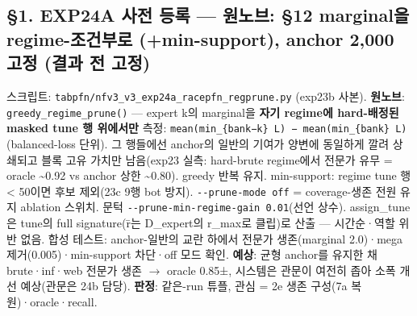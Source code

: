 \subsection{§1. EXP24A 사전 등록 — 원노브: §12 marginal을 regime-조건부로 (+\allowbreak{}min-support), anchor 2,000 고정 (결과 전 고정)}
스크립트: \texttt{tabpfn/\allowbreak{}\allowbreak{}n\allowbreak{}fv3\_\allowbreak{}\allowbreak{}v3\_\allowbreak{}\allowbreak{}e\allowbreak{}xp24a\_\allowbreak{}\allowbreak{}ra\allowbreak{}cepfn\_\allowbreak{}\allowbreak{}re\allowbreak{}gprune.\allowbreak{}p\allowbreak{}y} (exp23b 사본). \textbf{원노브}: \texttt{greedy\_\allowbreak{}\allowbreak{}r\allowbreak{}egime\_\allowbreak{}\allowbreak{}pr\allowbreak{}une()} — expert k의 marginal을 \textbf{자기 regime에 hard-배정된 masked tune 행 위에서만} 측정: \texttt{mean(min\allowbreak{}\_\allowbreak{}\allowbreak{}\{\allowbreak{}bank−k\allowbreak{}\}\allowbreak{} L) − m\allowbreak{}ean(min\_\allowbreak{}\allowbreak{}\{\allowbreak{}bank\}\allowbreak{} L\allowbreak{})} (balanced-loss 단위). 그 행들에선 anchor의 일반의 기여가 양변에 동일하게 깔려 상쇄되고 블록 고유 가치만 남음(exp23 실측: hard-brute regime에서 전문가 유무 =\allowbreak{} oracle \textasciitilde{}0.92 vs anchor 상한 \textasciitilde{}0.80). greedy 반복 유지. min-support: regime tune 행 < 50이면 후보 제외(23c 9행 bot 방지). \texttt{-\allowbreak{}-\allowbreak{}prune-\allowbreak{}mode off\allowbreak{}} =\allowbreak{} coverage-생존 전원 유지 ablation 스위치. 문턱 \texttt{-\allowbreak{}-\allowbreak{}prune-\allowbreak{}min-\allowbreak{}regi\allowbreak{}me-\allowbreak{}gain \allowbreak{}0.\allowbreak{}01}(선언 상수). assign\_\allowbreak{}tune은 tune의 full signature(r̄는 D\_\allowbreak{}expert의 r\_\allowbreak{}max로 클립)로 산출 — 시간순·역할 위반 없음. 합성 테스트: anchor-일반의 교란 하에서 전문가 생존(marginal 2.0)·mega 제거(0.005)·min-support 차단·off 모드 확인. \textbf{예상}: 균형 anchor를 유지한 채 brute·inf·web 전문가 생존  \ensuremath{\rightarrow}  oracle 0.85±, 시스템은 관문이 여전히 좁아 소폭 개선 예상(관문은 24b 담당). \textbf{판정}: 같은-run 튜플, 관심 =\allowbreak{} 2e 생존 구성(7a 복원)·oracle·recall.

